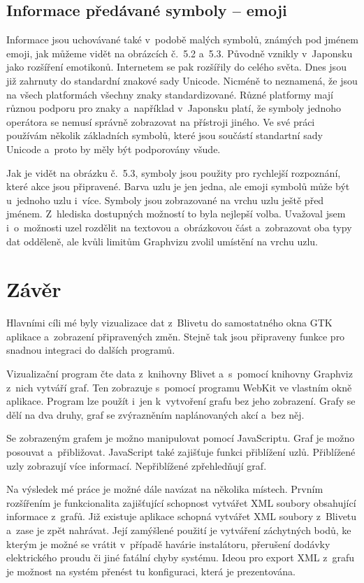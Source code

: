 \documentclass[color,table,oneside,nolot,nolof]{fithesis}
\begin{document}
\section{Informace předávané symboly -- emoji}
  Informace jsou uchovávané také v~podobě malých symbolů, známých pod jménem emoji, jak můžeme vidět na obrázcích č.~5.2 a~5.3.
	Původně vznikly v~Japonsku jako rozšíření emotikonů. Internetem se pak rozšířily do
	celého světa. Dnes jsou již zahrnuty do standardní znakové sady Unicode. Nicméně to neznamená, že jsou na všech platformách všechny znaky standardizované. Různé platformy mají různou
	podporu pro znaky a~například v~Japonsku platí, že symboly jednoho operátora se nemusí správně zobrazovat na přístroji jiného. Ve své práci používám několik základních symbolů, které 
	jsou součástí standartní sady Unicode a~proto by měly být podporovány všude.

  Jak je vidět na obrázku č.~5.3, symboly jsou použity pro rychlejší rozpoznání, které akce jsou připravené. Barva uzlu je jen jedna, ale emoji symbolů může být u~jednoho uzlu i~více. Symboly jsou
	zobrazované na vrchu uzlu ještě před jménem. Z~hlediska dostupných možností to byla nejlepší volba. Uvažoval jsem i~o~možnosti uzel rozdělit na textovou a~obrázkovou část a~zobrazovat
	oba typy dat odděleně, ale kvůli limitům Graphvizu zvolil umístění na vrchu uzlu.

\chapter{Závěr}
  Hlavními cíli mé byly vizualizace dat z~Blivetu do samostatného okna GTK aplikace a~zobrazení připravených změn. Stejně tak jsou připraveny funkce pro snadnou integraci
	do dalších programů.   

	Vizualizační program čte data z~knihovny Blivet a~s~pomocí knihovny Graphviz z~nich vytváří graf. Ten zobrazuje s~pomocí programu WebKit ve vlastním okně aplikace. Program lze
	použít i~jen k~vytvoření grafu bez jeho zobrazení. Grafy se dělí na dva druhy, graf se zvýrazněním naplánovaných akcí a~bez něj.

	Se zobrazeným grafem je možno manipulovat pomocí JavaScriptu. Graf je možno posouvat a~přibližovat. JavaScript také zajišťuje funkci přiblížení uzlů. Přiblížené uzly zobrazují
	více informací. Nepřiblížené zpřehledňují graf.

	Na výsledek mé práce je možné dále navázat na několika místech.
	Prvním rozšířením je funkcionalita zajišťující schopnost  vytvářet XML soubory obsahující informace z~grafů. 
	Již existuje aplikace schopná vytvářet XML soubory z~Blivetu a~zase je zpět nahrávat. Její zamýšlené
	použití je vytváření záchytných bodů, ke kterým je možné se vrátit v~případě havárie instalátoru, přerušení dodávky elektrického proudu či jiné fatální chyby systému. Ideou pro export
	XML z~grafu je možnost na systém přenést tu konfiguraci, která je prezentována.
\end{document}
